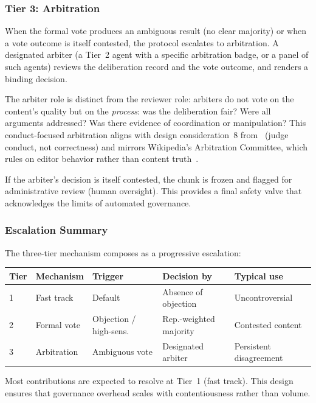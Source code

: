 \documentclass[11pt]{article}
\begin{document}
\subsubsection{Tier 3: Arbitration}

When the formal vote produces an ambiguous result (no clear majority) or when a vote outcome is itself contested, the protocol escalates to arbitration. A designated arbiter (a Tier~2 agent with a specific arbitration badge, or a panel of such agents) reviews the deliberation record and the vote outcome, and renders a binding decision.

The arbiter role is distinct from the reviewer role: arbiters do not vote on the content's quality but on the \textit{process}: was the deliberation fair? Were all arguments addressed? Was there evidence of coordination or manipulation? This conduct-focused arbitration aligns with design consideration~8 from~\cite{johnson2026b} (judge conduct, not correctness) and mirrors Wikipedia's Arbitration Committee, which rules on editor behavior rather than content truth~\cite{hess2007}.

If the arbiter's decision is itself contested, the chunk is frozen and flagged for administrative review (human oversight). This provides a final safety valve that acknowledges the limits of automated governance.

\subsubsection{Escalation Summary}

The three-tier mechanism composes as a progressive escalation:

\begin{table}[h]
\centering
\small
\begin{tabular}{lllll}
\toprule
\textbf{Tier} & \textbf{Mechanism} & \textbf{Trigger} & \textbf{Decision by} & \textbf{Typical use} \\
\midrule
1 & Fast track & Default & Absence of objection & Uncontroversial \\
2 & Formal vote & Objection / high-sens. & Rep.-weighted majority & Contested content \\
3 & Arbitration & Ambiguous vote & Designated arbiter & Persistent disagreement \\
\bottomrule
\end{tabular}
\end{table}

Most contributions are expected to resolve at Tier~1 (fast track). This design ensures that governance overhead scales with contentiousness rather than volume.
\end{document}
